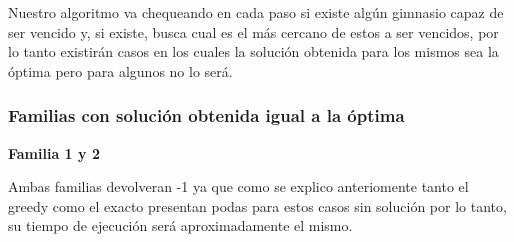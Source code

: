 Nuestro algoritmo va chequeando en cada paso si existe alg\'un gimnasio capaz de ser vencido y, si existe, busca cual es el m\'as cercano de estos a ser vencidos, por lo tanto existir\'an casos en los cuales la soluci\'on obtenida para los mismos sea la \'optima pero para algunos no lo ser\'a.

\subsubsection*{Familias con soluci\'on obtenida igual a la \'optima}


\begin{center}
\textbf{Familia 1 y 2}
\end{center}

Ambas familias devolveran -1 ya que como se explico anteriomente tanto el greedy como el exacto presentan podas para estos casos sin soluci\'on por lo tanto, su tiempo de ejecuci\'on ser\'a aproximadamente el mismo. \\\\\\\\\\\\\\\\\\\



